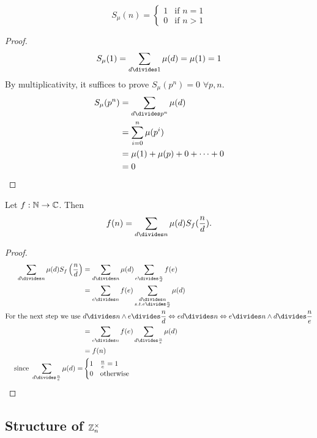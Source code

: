 \documentclass[NumTh.tex]{subfiles}
\begin{document}
\begin{lemma}
  \[
    S_\mu(n) = \begin{cases}
      1 & \text{if } n=1 \\
      0 & \text{if } n>1
    \end{cases}
  \]
\end{lemma}

\begin{proof}
  \[ S_\mu(1) = \sum_{d\divides 1} \mu(d) = \mu(1) = 1 \]
  By multiplicativity, it suffices to prove $S_\mu(p^n) = 0$ $\forall p,n$.
  \begin{align*}
    S_\mu(p^n) &= \sum_{d\divides p^n} \mu(d) \\
               &= \sum_{i=0}^n \mu(p^i) \\
               &= \mu(1) + \mu(p) + 0 +\dots+0 \\
               &= 0
  \end{align*}
\end{proof}

\begin{theorem}
  Let $f: \mathbb{N} \to \mathbb{C}$. Then
  \[ f(n) = \sum_{d\divides n} \mu(d) S_f(\frac{n}{d}) \text{.}\]
\end{theorem}

\begin{proof}
  \begin{align*}
    \sum_{d\divides n} \mu(d) S_f\left(\frac{n}{d}\right)
      &= \sum_{d\divides n} \mu(d) \sum_{e\divides \frac{n}{d}} f(e) \\
      &= \sum_{e\divides n} f(e) \sum_{\substack{d\divides n \\ s.t. e\divides \frac{n}{d}}} \mu(d) \\
      \text{For the next step we use }
		    &d\divides n \land e\divides \frac{n}{d}
		    \Leftrightarrow e d \divides n
		    \Leftrightarrow e\divides n \land d\divides \frac{n}{e}\\
      &= \sum_{e\divides n} f(e) \sum_{d\divides  \frac{n}{e}} \mu(d)\\
      &= f(n)\\
      \text{since }
        \sum_{d\divides  \frac{n}{e}} \mu(d) =
		&\begin{cases}
		  1 & \frac{n}{e} = 1 \\
		  0 & \text{otherwise}
		\end{cases}
  \end{align*}
\end{proof}


\subsection{Structure of $\mathbb{Z}_n^\times$}
\end{document}
